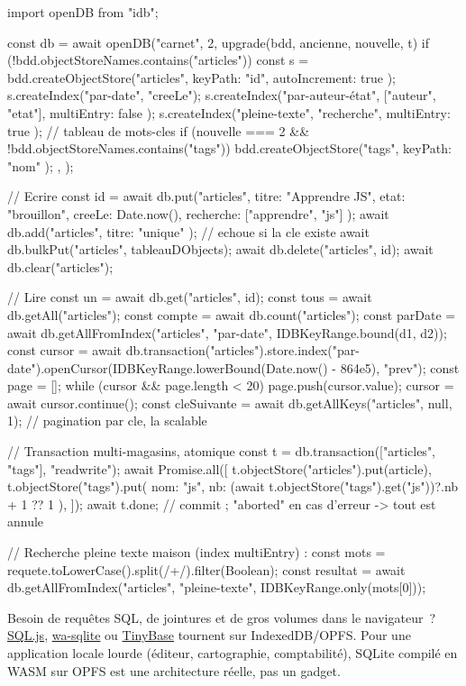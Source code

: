\documentclass[12pt,a4paper,twoside,openright]{book}
\newcommand{\link}[2]{\href{#2}{#1}}
\begin{document}
\begin{codejs}
import { openDB } from "idb";

const db = await openDB("carnet", 2, {
  upgrade(bdd, ancienne, nouvelle, t) {
    if (!bdd.objectStoreNames.contains("articles")) {
      const s = bdd.createObjectStore("articles", { keyPath: "id", autoIncrement: true });
      s.createIndex("par-date", "creeLe");
      s.createIndex("par-auteur-\'etat", ["auteur", "etat"], { multiEntry: false });
      s.createIndex("pleine-texte", "recherche", { multiEntry: true });   // tableau de mots-cles
    }
    if (nouvelle === 2 && !bdd.objectStoreNames.contains("tags")) {
      bdd.createObjectStore("tags", { keyPath: "nom" });
    }
  },
});

// Ecrire
const id = await db.put("articles", { titre: "Apprendre JS", etat: "brouillon", creeLe: Date.now(), recherche: ["apprendre", "js"] });
await db.add("articles", { titre: "unique" });           // echoue si la cle existe
await db.bulkPut("articles", tableauDObjects);
await db.delete("articles", id);
await db.clear("articles");

// Lire
const un = await db.get("articles", id);
const tous = await db.getAll("articles");
const compte = await db.count("articles");
const parDate = await db.getAllFromIndex("articles", "par-date", IDBKeyRange.bound(d1, d2));
const cursor = await db.transaction("articles").store.index("par-date").openCursor(IDBKeyRange.lowerBound(Date.now() - 864e5), "prev");
const page = [];
while (cursor && page.length < 20) { page.push(cursor.value); cursor = await cursor.continue(); }
const cleSuivante = await db.getAllKeys("articles", null, 1);   // pagination par cle, la scalable

// Transaction multi-magasins, atomique
const t = db.transaction(["articles", "tags"], "readwrite");
await Promise.all([
  t.objectStore("articles").put(article),
  t.objectStore("tags").put({ nom: "js", nb: (await t.objectStore("tags").get("js"))?.nb + 1 ?? 1 }),
]);
await t.done;      // commit ; "aborted" en cas d'erreur -> tout est annule

// Recherche pleine texte maison (index multiEntry) :
const mots = requete.toLowerCase().split(/\s+/).filter(Boolean);
const resultat = await db.getAllFromIndex("articles", "pleine-texte", IDBKeyRange.only(mots[0]));
\end{codejs}

\begin{astuce}
Besoin de requ\^etes SQL, de jointures et de gros volumes dans le navigateur~?
\link{SQL.js}{https://sql.js.org/}, \link{wa-sqlite}{https://github.com/rhashimoto/wa-sqlite} ou
\link{TinyBase}{https://tinybase.org/} tournent sur IndexedDB/OPFS. Pour une application locale
lourde (\'editeur, cartographie, comptabilit\'e), SQLite compil\'e en WASM sur OPFS est
une architecture r\'eelle, pas un gadget.
\end{astuce}
\end{document}
